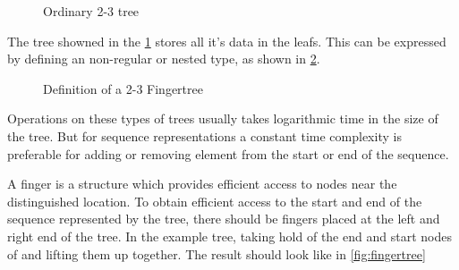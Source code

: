 \begin{figure}[!h]
\centering
{}
\caption{Ordinary 2-3 tree
\label{fig:2-3tree}}
\end{figure}

The tree showned in the \cref{fig:2-3tree} stores all it's data in the leafs.
This can be expressed by defining an non-regular or nested type, as shown in
\cref{fig:2-3Fingertree}.

\begin{figure}[h!]

\caption{Definition of a 2-3 Fingertree \label{fig:2-3Fingertree}}
\end{figure}

Operations on these types of trees usually takes logarithmic time in the size of
the tree. But for sequence representations a constant time complexity is
preferable for adding or removing element from the start or end of the sequence.

A finger is a structure which provides efficient access to nodes near the
distinguished location. To obtain efficient access to the start and end of the
sequence represented by the tree, there should be fingers placed at the left and
right end of the tree. In the example tree, taking hold of the end and start
nodes of and lifting them up together. The result should look like in
\cref{fig:fingertree}

